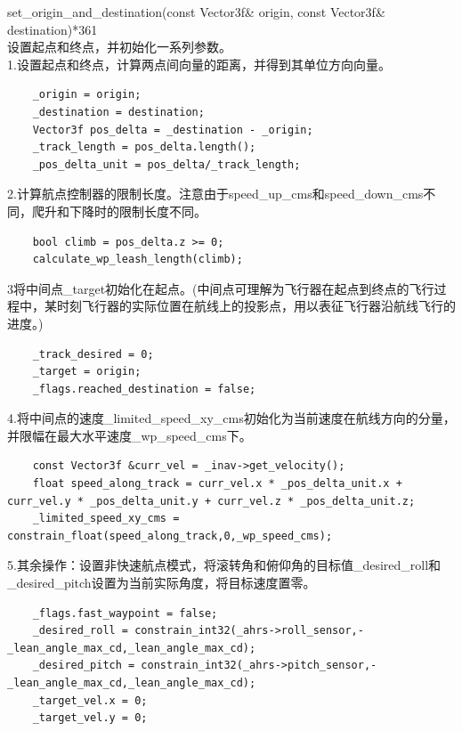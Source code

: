 \documentclass[a4paper,10pt]{ctexart} %
\begin{document}
\vspace{8pt}
\noindent set\_origin\_and\_destination(const Vector3f\& origin, const Vector3f\& destination){\color{red}*361}\\
设置起点和终点，并初始化一系列参数。\\
1.设置起点和终点，计算两点间向量的距离，并得到其单位方向向量。
\begin{lstlisting}
    _origin = origin;
    _destination = destination;
    Vector3f pos_delta = _destination - _origin;
    _track_length = pos_delta.length(); 
    _pos_delta_unit = pos_delta/_track_length;
\end{lstlisting}
2.计算航点控制器的限制长度。注意由于speed\_up\_cms和speed\_down\_cms不同，爬升和下降时的限制长度不同。
\begin{lstlisting}
    bool climb = pos_delta.z >= 0;
    calculate_wp_leash_length(climb); 
\end{lstlisting}
3将中间点\_target初始化在起点。(中间点可理解为飞行器在起点到终点的飞行过程中，某时刻飞行器的实际位置在航线上的投影点，用以表征飞行器沿航线飞行的进度。)
\begin{lstlisting}
    _track_desired = 0;
    _target = origin;
    _flags.reached_destination = false;
\end{lstlisting}
4.将中间点的速度\_limited\_speed\_xy\_cms初始化为当前速度在航线方向的分量，并限幅在最大水平速度\_wp\_speed\_cms下。
\begin{lstlisting}
    const Vector3f &curr_vel = _inav->get_velocity();
    float speed_along_track = curr_vel.x * _pos_delta_unit.x + curr_vel.y * _pos_delta_unit.y + curr_vel.z * _pos_delta_unit.z;
    _limited_speed_xy_cms = constrain_float(speed_along_track,0,_wp_speed_cms);
\end{lstlisting}
5.其余操作：设置非快速航点模式，将滚转角和俯仰角的目标值\_desired\_roll和\_desired\_pitch设置为当前实际角度，将目标速度置零。
\begin{lstlisting}
    _flags.fast_waypoint = false;
    _desired_roll = constrain_int32(_ahrs->roll_sensor,-_lean_angle_max_cd,_lean_angle_max_cd);
    _desired_pitch = constrain_int32(_ahrs->pitch_sensor,-_lean_angle_max_cd,_lean_angle_max_cd);
    _target_vel.x = 0;
    _target_vel.y = 0;
\end{lstlisting}
\end{document}

